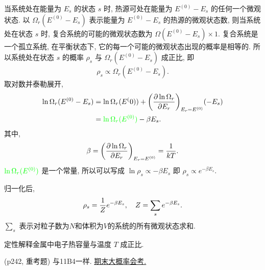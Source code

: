 \begin{questions}
\begin{solution}
  当系统处在能量为 $E_s$ 的状态 $s$ 时, 热源可处在能量为 $E^{(0)}-E_s$ 的任何一个微观状态. 以 $\Omega_r(E^{(0)}-E_s)$ 表示能量为 $E^{(0)}-E_s$ 的热源的微观状态数, 则当系统处在状态 $s$ 时, 复合系统的可能的微观状态数为 $\Omega(E^{(0)}-E_s)\times 1$. 复合系统是一个孤立系统, 在平衡状态下, 它的每一个可能的微观状态出现的概率是相等的. 所以系统处在状态 $s$ 的概率 $\rho_s$ 与 $\Omega_r(E^{(0)}-E_s)$ 成正比, 即
  \begin{equation}
    \rho_s \propto \Omega_r(E^{(0)}-E_s).
  \end{equation}
  取对数并泰勒展开,
  \begin{equation}
    \begin{aligned}
      \ln\Omega_r(E^{(0)}-E_s) & = \ln\Omega_r(E^(0)) + \qty(\pdv{\ln\Omega_r}{E_r})_{E_r=E^{(0)}}(-E_s) \\
                               & = {\color{green}\ln\Omega_r(E^{(0)})} - \beta E_s.
    \end{aligned}
  \end{equation}
  其中,
  \begin{equation}
    \beta = \qty(\pdv{\ln\Omega_r}{E_r})_{E_r=E^{(0)}} = \frac{1}{kT}.
  \end{equation}
  ${\color{green}\ln\Omega_r(E^{(0)})}$ 是一个常量, 所以可以写成 $\ln\rho_s\propto - \beta E_s$ 即 $\rho_s \propto e^{-\beta E_s}$.

  归一化后,
  \begin{equation}
    \rho_s = \frac{1}{Z}e^{-\beta E_s} \qc
    Z = \sum_s e^{-\beta E_s}.
  \end{equation}
  $\sum\limits_s$ 表示对粒子数为$N$和体积为$V$的系统的所有微观状态求和.
\end{solution}
\qt 定性解释金属中电子热容量与温度 $T$ 成正比.
\begin{solution}
  (p242, 重考题) 与11B4一样. \uline{期末大概率会考.}
\end{solution}
\end{questions}
